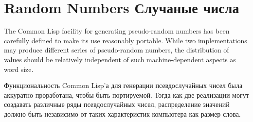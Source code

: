 \section{Random Numbers Случаные числа}
\label{RANDOM}

The Common Lisp facility for generating pseudo-random numbers has
been carefully defined to make its use reasonably portable.
While two implementations may produce different series
of pseudo-random numbers, the distribution of values should
be relatively independent of such machine-dependent aspects
as word size.

Функциональность Common Lisp'а для генерации псевдослучайных чисел была
аккуратно проработана, чтобы быть портируемой. Тогда как две реализации могут
создавать различные ряды псевдослучайных чисел, распределение значений должно
быть независимо от таких характеристик компьютера как размер слова.

